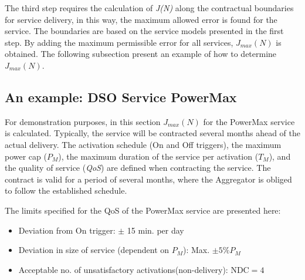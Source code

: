 	The third step requires the calculation of \emph{J(N)} along the contractual boundaries for service delivery, in this way, the maximum allowed error is found for the service. The boundaries are based on the service models presented in the first step. By adding the maximum permissible error for all services, $J_{max}(N)$ is obtained. 
	The following subsection present an example of how to determine $J_{max}(N)$.

	\subsection{An example: DSO Service PowerMax}\label{sub:example}
	For demonstration purposes, in this section $J_{max}(N)$ for the PowerMax service is calculated. 
	Typically, the service will be contracted several months ahead of the actual delivery. The activation schedule (On and Off triggers), the maximum power cap ($P_M$), the maximum duration of the service per activation ($T_M$), and the quality of service (\emph{QoS}) are defined when contracting the service. The contract is valid for a period of several months, where the Aggregator is obliged to follow the established schedule.

	The limits specified for the QoS\cite{FLECH} of the PowerMax service are presented here: 
	\begin{itemize}
		\item Deviation from On trigger: $\pm$ 15 min. per day
		\item Deviation in size of service (dependent on $P_M$): Max. $\pm 5\% P_M$  
		\item Acceptable no. of unsatisfactory activations(non-delivery): $\text{NDC} = 4$
	\end{itemize}

